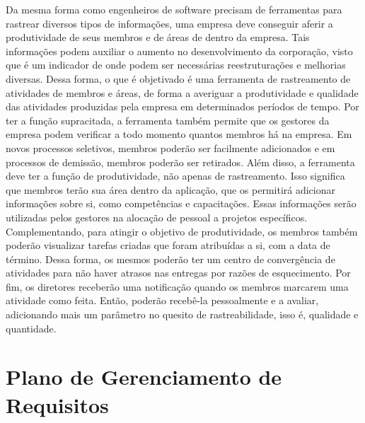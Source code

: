 \begin{apendicesenv}
Da mesma forma como engenheiros de software precisam de ferramentas para rastrear diversos tipos de informações, uma empresa deve conseguir aferir a produtividade de seus membros e de áreas de dentro da empresa.
Tais informações podem auxiliar o aumento no desenvolvimento da corporação, visto que é um indicador de onde podem ser necessárias reestruturações e melhorias diversas.
Dessa forma, o que é objetivado é uma ferramenta de rastreamento de atividades de membros e áreas, de forma a averiguar a produtividade e qualidade das atividades produzidas pela empresa em determinados períodos de tempo.
Por ter a função supracitada, a ferramenta também permite que os gestores da empresa podem verificar a todo momento quantos membros há na empresa. Em novos processos seletivos, membros poderão ser facilmente adicionados e em processos de demissão, membros poderão ser retirados.
Além disso, a ferramenta deve ter a função de produtividade, não apenas de rastreamento. Isso significa que membros terão sua área dentro da aplicação, que os permitirá adicionar informações sobre si, como competências e capacitações. Essas informações serão utilizadas pelos gestores na alocação de pessoal a projetos específicos.
Complementando, para atingir o objetivo de produtividade, os membros também poderão visualizar tarefas criadas que foram atribuídas a si, com a data de término. Dessa forma, os mesmos poderão ter um centro de convergência de atividades para não haver atrasos nas entregas por razões de esquecimento.
Por fim, os diretores receberão uma notificação quando os membros marcarem uma atividade como feita. Então, poderão recebê-la pessoalmente e a avaliar, adicionando mais um parâmetro no quesito de rastreabilidade, isso é, qualidade e quantidade.






























\chapter{Plano de Gerenciamento de Requisitos}
\label{plano_de_gerenciamento_de_requisitos}


\end{apendicesenv}
